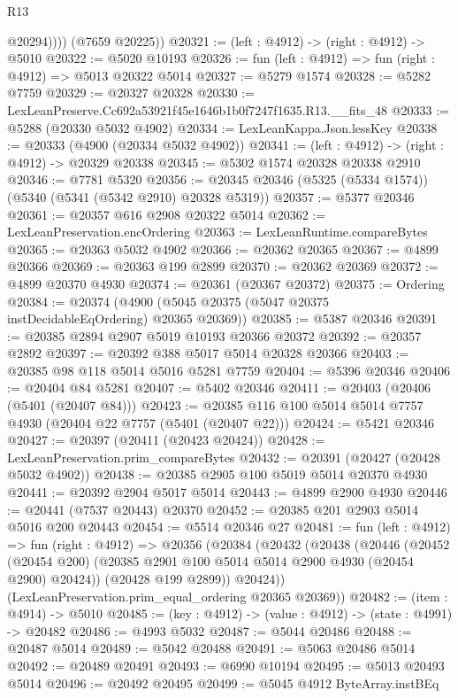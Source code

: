 \begin{lexlean}{R13}
\begin{coremodule}
              @20294))))
      (@7659 @20225))
@20321 := (left : @4912) -> (right : @4912) -> @5010
@20322 := @5020 @10193
@20326 := fun (left : @4912) => fun (right : @4912) => @5013 @20322 @5014
@20327 := @5279 @1574
@20328 := @5282 @7759
@20329 := @20327 @20328
@20330 := LexLeanPreserve.Cc692a53921f45e1646b1b0f7247f1635.R13.__fits_48
@20333 := @5288 (@20330 @5032 @4902)
@20334 := LexLeanKappa.Json.lessKey
@20338 := @20333 (@4900 (@20334 @5032 @4902))
@20341 := (left : @4912) -> (right : @4912) -> @20329 @20338
@20345 := @5302 @1574 @20328 @20338 @2910
@20346 := @7781 @5320
@20356 := @20345 @20346 (@5325 (@5334 @1574)) (@5340 (@5341 (@5342 @2910) @20328 @5319))
@20357 := @5377 @20346
@20361 := @20357 @616 @2908 @20322 @5014
@20362 := LexLeanPreservation.encOrdering
@20363 := LexLeanRuntime.compareBytes
@20365 := @20363 @5032 @4902
@20366 := @20362 @20365
@20367 := @4899 @20366
@20369 := @20363 @199 @2899
@20370 := @20362 @20369
@20372 := @4899 @20370 @4930
@20374 := @20361 (@20367 @20372)
@20375 := Ordering
@20384 := @20374 (@4900 (@5045 @20375 (@5047 @20375 instDecidableEqOrdering) @20365 @20369))
@20385 := @5387 @20346
@20391 := @20385 @2894 @2907 @5019 @10193 @20366 @20372
@20392 := @20357 @2892
@20397 := @20392 @388 @5017 @5014 @20328 @20366
@20403 := @20385 @98 @118 @5014 @5016 @5281 @7759
@20404 := @5396 @20346
@20406 := @20404 @84 @5281
@20407 := @5402 @20346
@20411 := @20403 (@20406 (@5401 (@20407 @84)))
@20423 := @20385 @116 @100 @5014 @5014 @7757 @4930 (@20404 @22 @7757 (@5401 (@20407 @22)))
@20424 := @5421 @20346
@20427 := @20397 (@20411 (@20423 @20424))
@20428 := LexLeanPreservation.prim_compareBytes
@20432 := @20391 (@20427 (@20428 @5032 @4902))
@20438 := @20385 @2905 @100 @5019 @5014 @20370 @4930
@20441 := @20392 @2904 @5017 @5014
@20443 := @4899 @2900 @4930
@20446 := @20441 (@7537 @20443) @20370
@20452 := @20385 @201 @2903 @5014 @5016 @200 @20443
@20454 := @5514 @20346 @27
@20481 := fun (left : @4912) =>
  fun (right : @4912) =>
  @20356
    (@20384
      (@20432
        (@20438
          (@20446
            (@20452 (@20454 @200) (@20385 @2901 @100 @5014 @5014 @2900 @4930 (@20454 @2900) @20424))
            (@20428 @199 @2899))
          @20424))
      (LexLeanPreservation.prim_equal_ordering @20365 @20369))
@20482 := (item : @4914) -> @5010
@20485 := (key : @4912) -> (value : @4912) -> (state : @4991) -> @20482
@20486 := @4993 @5032
@20487 := @5044 @20486
@20488 := @20487 @5014
@20489 := @5042 @20488
@20491 := @5063 @20486 @5014
@20492 := @20489 @20491
@20493 := @6990 @10194
@20495 := @5013 @20493 @5014
@20496 := @20492 @20495
@20499 := @5045 @4912 ByteArray.instBEq

\end{coremodule}
\end{lexlean}
